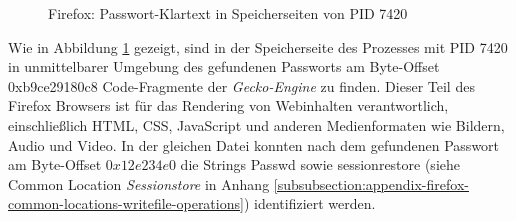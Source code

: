 \begin{figure}[h!]
	\centering
	\hfill
	\caption{Firefox: Passwort-Klartext in Speicherseiten von PID 7420}
	\label{img:firefox-pw-offset-pid-7420}  
\end{figure}
Wie in Abbildung \ref{img:firefox-pw-offset-pid-7420} gezeigt, sind in der Speicherseite des Prozesses mit PID 7420 in unmittelbarer Umgebung des gefundenen Passworts am Byte-Offset 0xb9ce29180c8 Code-Fragmente der \textit{Gecko-Engine} zu finden. Dieser Teil des Firefox Browsers ist für das Rendering von Webinhalten verantwortlich, einschließlich HTML, CSS, JavaScript und anderen Medienformaten wie Bildern, Audio und Video. \cite{MozillaWiki.05.06.2023}
In der gleichen Datei konnten nach dem gefundenen Passwort am Byte-Offset $0x12e234e0$ die Strings \grqq{}Passwd\grqq{} sowie \grqq{}sessionrestore\grqq{} (siehe Common Location \textit{Sessionstore} in Anhang \ref{subsubsection:appendix-firefox-common-locations-writefile-operations}) identifiziert werden. 

